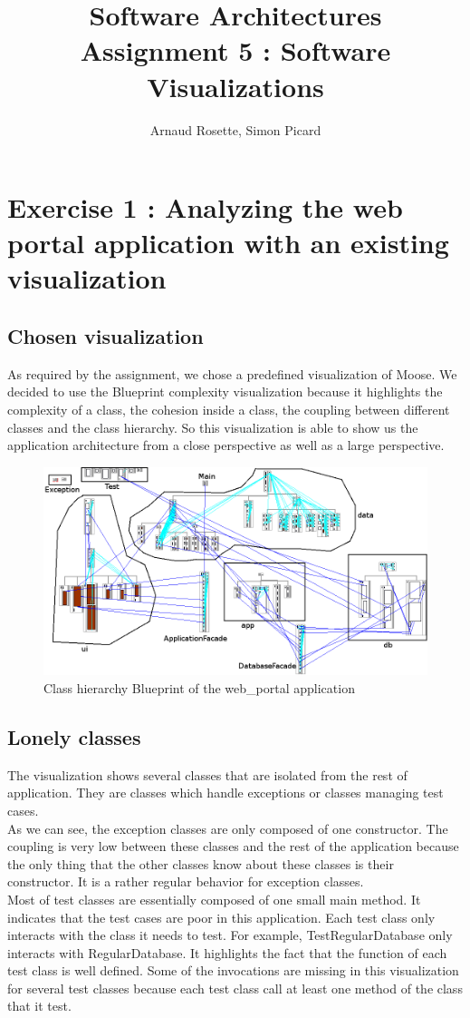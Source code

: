 \documentclass[a4paper,10pt]{article}
\title{Software Architectures\\ Assignment 5 : Software Visualizations}
\author{Arnaud Rosette, Simon Picard}
\begin{document}
\maketitle
\section{Exercise 1 : Analyzing the web portal application with an existing visualization}
\subsection{Chosen visualization}
As required by the assignment, we chose a predefined visualization of Moose. We decided to use the Blueprint complexity visualization because it highlights the complexity of a class, the cohesion inside a class, the coupling between different classes and the class hierarchy. So this visualization is able to show us the application architecture from a close perspective as well as a large perspective.
\begin{figure}[H]
\includegraphics[width=\textwidth]{src/blueprint.png}
\centering
\caption{Class hierarchy Blueprint of the web\_portal application}
\end{figure}
\subsection{Lonely classes}
The visualization shows several classes that are isolated from the rest of application. They are classes which handle exceptions or classes managing test cases.\\
As we can see, the exception classes are only composed of one constructor. The coupling is very low between these classes and the rest of the application because the only thing that the other classes know about these classes is their constructor. It is a rather regular behavior for exception classes.\\
Most of test classes are essentially composed of one small  main method. It indicates that the test cases are poor in this application. Each test class only interacts with the class it needs to test. For example, TestRegularDatabase only interacts with RegularDatabase. It highlights the fact that the function of each test class is well defined. Some of the invocations are missing in this visualization for several test classes because each test class call at least one method of the class that it test.
\end{document}
